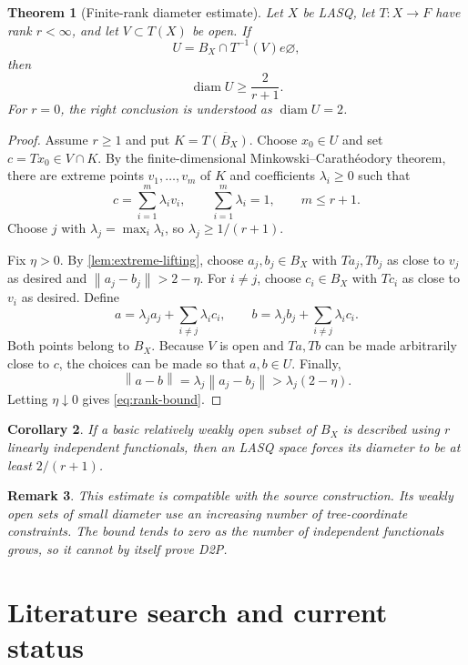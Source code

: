 \documentclass[11pt]{article}
\newtheorem{theorem}{Theorem}[section]
\newtheorem{corollary}[theorem]{Corollary}
\newtheorem{remark}[theorem]{Remark}
\newcommand{\diam}{\operatorname{diam}}
\newcommand{\norm}[1]{\left\lVert #1\right\rVert}
\begin{document}
\begin{theorem}[Finite-rank diameter estimate]
\label{thm:finite-rank}
Let $X$ be LASQ, let $T:X\to F$ have rank $r<\infty$, and let $V\subset T(X)$ be open.  If
\[
 U=B_X\cap T^{-1}(V)
e\varnothing,
\]
then
\begin{equation}
\label{eq:rank-bound}
 \diam U\ge\frac{2}{r+1}.
\end{equation}
For $r=0$, the right conclusion is understood as $\diam U=2$.
\end{theorem}

\begin{proof}
Assume $r\ge1$ and put $K=\overline{T(B_X)}$.  Choose $x_0\in U$ and set $c=Tx_0\in V\cap K$.  By the finite-dimensional Minkowski--Carath\'eodory theorem, there are extreme points $v_1,\dots,v_m$ of $K$ and coefficients $\lambda_i\ge0$ such that
\[
 c=\sum_{i=1}^m\lambda_i v_i,
 \qquad
 \sum_{i=1}^m\lambda_i=1,
 \qquad
 m\le r+1.
\]
Choose $j$ with $\lambda_j=\max_i\lambda_i$, so $\lambda_j\ge1/(r+1)$.

Fix $\eta>0$.  By \cref{lem:extreme-lifting}, choose $a_j,b_j\in B_X$ with $Ta_j,Tb_j$ as close to $v_j$ as desired and $\norm{a_j-b_j}>2-\eta$.  For $i\ne j$, choose $c_i\in B_X$ with $Tc_i$ as close to $v_i$ as desired.  Define
\[
 a=\lambda_j a_j+\sum_{i\ne j}\lambda_i c_i,
 \qquad
 b=\lambda_j b_j+\sum_{i\ne j}\lambda_i c_i.
\]
Both points belong to $B_X$.  Because $V$ is open and $Ta,Tb$ can be made arbitrarily close to $c$, the choices can be made so that $a,b\in U$.  Finally,
\[
 \norm{a-b}=\lambda_j\norm{a_j-b_j}
 >\lambda_j(2-\eta).
\]
Letting $\eta\downarrow0$ gives \eqref{eq:rank-bound}.
\end{proof}

\begin{corollary}
If a basic relatively weakly open subset of $B_X$ is described using $r$ linearly independent functionals, then an LASQ space forces its diameter to be at least $2/(r+1)$.
\end{corollary}

\begin{remark}
This estimate is compatible with the source construction.  Its weakly open sets of small diameter use an increasing number of tree-coordinate constraints.  The bound tends to zero as the number of independent functionals grows, so it cannot by itself prove D2P.
\end{remark}

\section{Literature search and current status}
\label{sec:literature}
\end{document}
